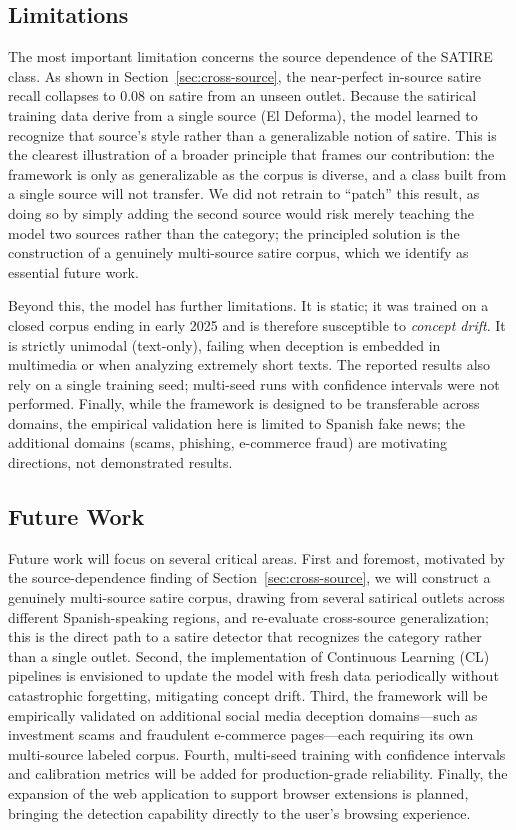 \documentclass[informatics,article,submit,pdftex,moreauthors]{Definitions/mdpi}
\begin{document}
\subsection{Limitations}\label{sec:limitations}
The most important limitation concerns the source dependence of the SATIRE class. As shown in Section~\ref{sec:cross-source}, the near-perfect in-source satire recall collapses to 0.08 on satire from an unseen outlet. Because the satirical training data derive from a single source (El Deforma), the model learned to recognize that source's style rather than a generalizable notion of satire. This is the clearest illustration of a broader principle that frames our contribution: the framework is only as generalizable as the corpus is diverse, and a class built from a single source will not transfer. We did not retrain to ``patch'' this result, as doing so by simply adding the second source would risk merely teaching the model two sources rather than the category; the principled solution is the construction of a genuinely multi-source satire corpus, which we identify as essential future work.

Beyond this, the model has further limitations. It is static; it was trained on a closed corpus ending in early 2025 and is therefore susceptible to \textit{concept drift}. It is strictly unimodal (text-only), failing when deception is embedded in multimedia or when analyzing extremely short texts. The reported results also rely on a single training seed; multi-seed runs with confidence intervals were not performed. Finally, while the framework is designed to be transferable across domains, the empirical validation here is limited to Spanish fake news; the additional domains (scams, phishing, e-commerce fraud) are motivating directions, not demonstrated results.

\subsection{Future Work}
Future work will focus on several critical areas. First and foremost, motivated by the source-dependence finding of Section~\ref{sec:cross-source}, we will construct a genuinely multi-source satire corpus, drawing from several satirical outlets across different Spanish-speaking regions, and re-evaluate cross-source generalization; this is the direct path to a satire detector that recognizes the category rather than a single outlet. Second, the implementation of Continuous Learning (CL) pipelines is envisioned to update the model with fresh data periodically without catastrophic forgetting, mitigating concept drift. Third, the framework will be empirically validated on additional social media deception domains—such as investment scams and fraudulent e-commerce pages—each requiring its own multi-source labeled corpus. Fourth, multi-seed training with confidence intervals and calibration metrics will be added for production-grade reliability. Finally, the expansion of the web application to support browser extensions is planned, bringing the detection capability directly to the user's browsing experience.
\end{document}
